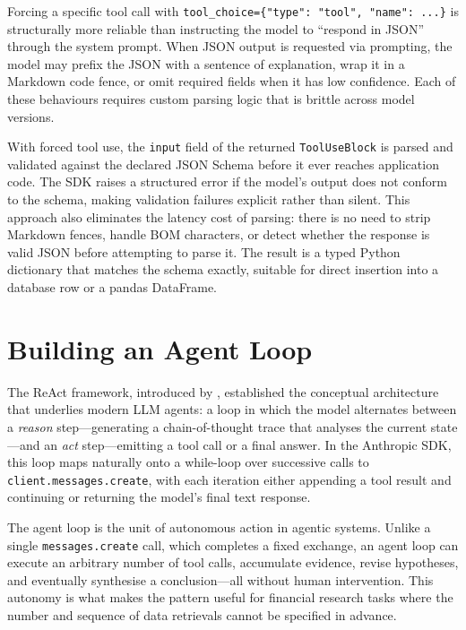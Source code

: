 \begin{deepdive}
Forcing a specific tool call with \texttt{tool\_choice=\{"type": "tool", "name": ...\}}
is structurally more reliable than instructing the model to ``respond in JSON'' through
the system prompt. When JSON output is requested via prompting, the model may prefix the
JSON with a sentence of explanation, wrap it in a Markdown code fence, or omit
required fields when it has low confidence. Each of these behaviours requires custom
parsing logic that is brittle across model versions.

With forced tool use, the \texttt{input} field of the returned \texttt{ToolUseBlock}
is parsed and validated against the declared JSON Schema before it ever reaches
application code. The SDK raises a structured error if the model's output does not
conform to the schema, making validation failures explicit rather than silent. This
approach also eliminates the latency cost of parsing: there is no need to strip
Markdown fences, handle BOM characters, or detect whether the response is valid JSON
before attempting to parse it. The result is a typed Python dictionary that matches the
schema exactly, suitable for direct insertion into a database row or a pandas
DataFrame.
\end{deepdive}

\section{Building an Agent Loop}
\label{app:sdk-commercial:agent-loop}

The ReAct framework, introduced by \citet{yao2022react}, established the conceptual
architecture that underlies modern LLM agents: a loop in which the model alternates
between a \emph{reason} step---generating a chain-of-thought trace that analyses the
current state---and an \emph{act} step---emitting a tool call or a final answer.
In the Anthropic SDK, this loop maps naturally onto a while-loop over successive calls
to \texttt{client.messages.create}, with each iteration either appending a tool result
and continuing or returning the model's final text response.

The agent loop is the unit of autonomous action in agentic systems. Unlike a single
\texttt{messages.create} call, which completes a fixed exchange, an agent loop can
execute an arbitrary number of tool calls, accumulate evidence, revise hypotheses, and
eventually synthesise a conclusion---all without human intervention. This autonomy is
what makes the pattern useful for financial research tasks where the number and
sequence of data retrievals cannot be specified in advance.

